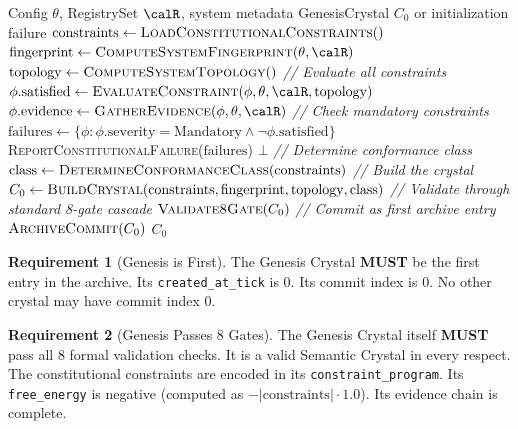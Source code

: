 \documentclass[11pt,a4paper,twoside]{article}
\theoremstyle{definition}
\newtheorem{requirement}{Requirement}[section]
\theoremstyle{plain}
\theoremstyle{remark}
\begin{document}
\begin{algorithm}[H]
\caption{\textsc{BuildGenesisCrystal}: Construct the system constitution}
\label{alg:genesis}
\begin{algorithmic}[1]
\REQUIRE Config $\theta$, RegistrySet $\calR$, system metadata
\ENSURE GenesisCrystal $C_0$ or initialization failure
\STATE $\mathrm{constraints} \gets \textsc{LoadConstitutionalConstraints}()$
\STATE $\mathrm{fingerprint} \gets \textsc{ComputeSystemFingerprint}(\theta, \calR)$
\STATE $\mathrm{topology} \gets \textsc{ComputeSystemTopology}()$
\STATE \textit{// Evaluate all constraints}
  \STATE $\phi.\mathrm{satisfied} \gets \textsc{EvaluateConstraint}(\phi, \theta, \calR, \mathrm{topology})$
  \STATE $\phi.\mathrm{evidence} \gets \textsc{GatherEvidence}(\phi, \theta, \calR)$
\ENDFOR
\STATE \textit{// Check mandatory constraints}
\STATE $\mathrm{failures} \gets \{\phi : \phi.\mathrm{severity} = \mathrm{Mandatory} \wedge \neg\phi.\mathrm{satisfied}\}$
  \STATE \textsc{ReportConstitutionalFailure}($\mathrm{failures}$)
  \RETURN $\bot$ 
\ENDIF
\STATE \textit{// Determine conformance class}
\STATE $\mathrm{class} \gets \textsc{DetermineConformanceClass}(\mathrm{constraints})$
\STATE \textit{// Build the crystal}
\STATE $C_0 \gets \textsc{BuildCrystal}(\mathrm{constraints}, \mathrm{fingerprint},
  \mathrm{topology}, \mathrm{class})$
\STATE \textit{// Validate through standard 8-gate cascade}
\STATE $\textsc{Validate8Gate}(C_0)$ 
\STATE \textit{// Commit as first archive entry}
\STATE $\textsc{ArchiveCommit}(C_0)$
\RETURN $C_0$
\end{algorithmic}
\end{algorithm}

\begin{requirement}[Genesis is First]\label{req:first}
The Genesis Crystal \textbf{MUST} be the first entry in the archive.
Its \texttt{created\_at\_tick} is 0. Its commit index is 0. No other
crystal may have commit index 0.
\end{requirement}

\begin{requirement}[Genesis Passes 8 Gates]\label{req:8gate}
The Genesis Crystal itself \textbf{MUST} pass all 8 formal validation
checks. It is a valid Semantic Crystal in every respect. The
constitutional constraints are encoded in its
\texttt{constraint\_program}. Its \texttt{free\_energy} is negative
(computed as $-|\mathrm{constraints}| \cdot 1.0$). Its evidence chain
is complete.
\end{requirement}
\end{document}
